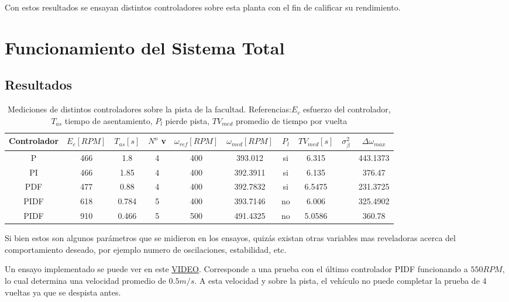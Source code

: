 \documentclass[10pt,conference,a4paper,onecolumn]{article}%
\begin{document}
Con estos resultados se ensayan distintos controladores sobre esta planta con el fin de calificar su rendimiento.


\section{Funcionamiento del Sistema Total}
 \subsection{Resultados} 
\label{sec:resultados}

\begin{table}[h]
\begin{center}
\begin{tabular}{|c|c|c|c|c|c|c|c|c|c|}
\hline
Controlador & $E_c [RPM]$ & $T_{as}[s]$ & $N^o$ v &$\omega_{ref}[RPM]$& $\omega_{med}[RPM]$ & $P_l$ & $TV_{med}[s]$ & $\sigma^2_\beta$ &$\Delta\omega _{max} $  \\
\hline \hline
P&466&1.8&4&400&393.012&si&6.315&&443.1373\\ \hline
PI&466&1.85&4&400&392.3911&si&6.135&&376.47\\ \hline
PDF&477&0.88&4&400&392.7832&si&6.5475&&231.3725\\ \hline
PIDF&618&0.784&5&400&393.7146&no&6.006&&325.4902\\ \hline
PIDF&910&0.466&5&500&491.4325&no&5.0586&&360.78\\ \hline

\end{tabular}
\caption{Mediciones de distintos controladores sobre la pista de la facultad. Referencias:$E_c$ esfuerzo del controlador,$T_{as}$ tiempo de asentamiento, $P_l$ pierde pista, $TV_{med}$ promedio de tiempo por vuelta}
\label{tabla:mediciones}
\end{center}
\end{table}

Si bien estos son algunos parámetros que se midieron en los ensayos, quizás existan otras variables mas reveladoras acerca del comportamiento deseado, por ejemplo numero de oscilaciones, estabilidad, etc.

Un ensayo implementado se puede ver en este \href{https://youtu.be/hJU_oneTO20}{\underline{VIDEO}}. Corresponde a una prueba con el último controlador PIDF funcionando a $550RPM$, lo cual determina una velocidad promedio de $0.5m/s$. A esta velocidad y sobre la pista, el vehículo no puede completar la prueba de 4 vueltas ya que se despista antes. 
\end{document}
